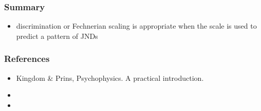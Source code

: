 \documentclass[]{beamer}
\begin{document}
\begin{frame}
 \frametitle{Summary}
\begin{itemize}
 \item discrimination or Fechnerian scaling is appropriate when the scale is used to predict a pattern of JNDs
\end{itemize}
\end{frame}


\begin{frame}
 \frametitle{References}
\begin{small}
\begin{itemize}
 \item  Kingdom \& Prins, Psychophysics. A practical introduction. 
 \item 
 \item 
\end{itemize}
\end{small}
\end{frame}
\end{document}
